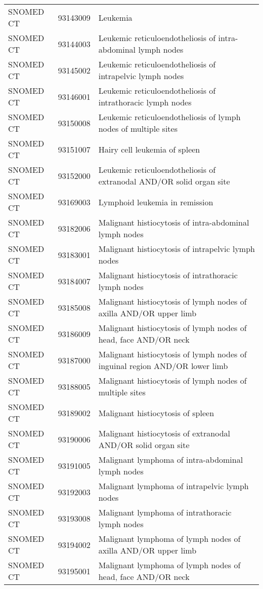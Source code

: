 \begin{longtable}{p{}p{}p{}}
  SNOMED CT & 93143009 & Leukemia \\ 
  SNOMED CT & 93144003 & Leukemic reticuloendotheliosis of intra-abdominal lymph nodes \\ 
  SNOMED CT & 93145002 & Leukemic reticuloendotheliosis of intrapelvic lymph nodes \\ 
  SNOMED CT & 93146001 & Leukemic reticuloendotheliosis of intrathoracic lymph nodes \\ 
  SNOMED CT & 93150008 & Leukemic reticuloendotheliosis of lymph nodes of multiple sites \\ 
  SNOMED CT & 93151007 & Hairy cell leukemia of spleen \\ 
  SNOMED CT & 93152000 & Leukemic reticuloendotheliosis of extranodal AND/OR solid organ site \\ 
  SNOMED CT & 93169003 & Lymphoid leukemia in remission \\ 
  SNOMED CT & 93182006 & Malignant histiocytosis of intra-abdominal lymph nodes \\ 
  SNOMED CT & 93183001 & Malignant histiocytosis of intrapelvic lymph nodes \\ 
  SNOMED CT & 93184007 & Malignant histiocytosis of intrathoracic lymph nodes \\ 
  SNOMED CT & 93185008 & Malignant histiocytosis of lymph nodes of axilla AND/OR upper limb \\ 
  SNOMED CT & 93186009 & Malignant histiocytosis of lymph nodes of head, face AND/OR neck \\ 
  SNOMED CT & 93187000 & Malignant histiocytosis of lymph nodes of inguinal region AND/OR lower limb \\ 
  SNOMED CT & 93188005 & Malignant histiocytosis of lymph nodes of multiple sites \\ 
  SNOMED CT & 93189002 & Malignant histiocytosis of spleen \\ 
  SNOMED CT & 93190006 & Malignant histiocytosis of extranodal AND/OR solid organ site \\ 
  SNOMED CT & 93191005 & Malignant lymphoma of intra-abdominal lymph nodes \\ 
  SNOMED CT & 93192003 & Malignant lymphoma of intrapelvic lymph nodes \\ 
  SNOMED CT & 93193008 & Malignant lymphoma of intrathoracic lymph nodes \\ 
  SNOMED CT & 93194002 & Malignant lymphoma of lymph nodes of axilla AND/OR upper limb \\ 
  SNOMED CT & 93195001 & Malignant lymphoma of lymph nodes of head, face AND/OR neck \\ 

\end{longtable}
